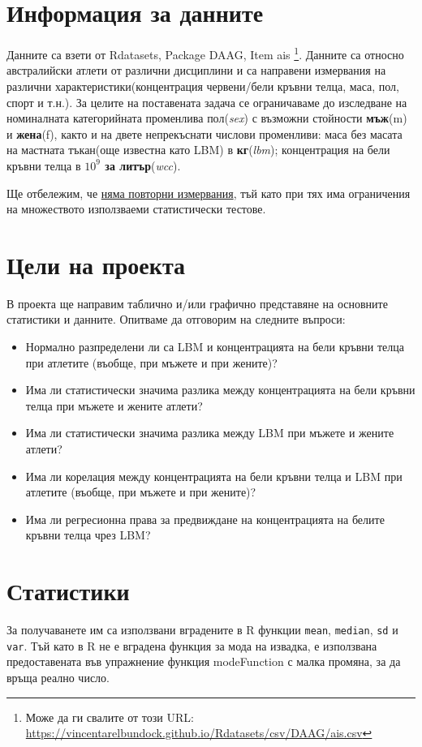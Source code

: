 \documentclass[12pt]{article} %
\newcommand{\code}{\texttt}
\begin{document}
\begin{large}

\tableofcontents{}


\section{Информация за данните}
Данните са взети от Rdatasets, Package DAAG, Item ais \footnote{Може да ги свалите от този URL: \url{https://vincentarelbundock.github.io/Rdatasets/csv/DAAG/ais.csv}}. Данните са относно австралийски атлети от различни дисциплини и са направени измервания на различни характеристики(концентрация червени/бели кръвни телца, маса, пол, спорт и т.н.). За целите на поставената задача се ограничаваме до изследване на номиналната категорийната променлива пол(\textit{sex}) с възможни стойности \textbf{мъж}(m) и \textbf{жена}(f), както и на двете непрекъснати числови променливи: маса без масата на мастната тъкан(още известна като LBM) в \textbf{кг}(\textit{lbm}); концентрация на бели кръвни телца в \textbf{$10^9$ за литър}(\textit{wcc}). \par
Ще отбележим, че \uline{няма повторни измервания}, тъй като при тях има ограничения на множеството използваеми статистически тестове.

\section{Цели на проекта}

В проекта ще направим таблично и/или графично представяне на основните статистики и данните. Опитваме да отговорим на следните въпроси:

\begin{itemize}
\item Нормално разпределени ли са LBM и концентрацията на бели кръвни телца при атлетите (въобще, при мъжете и при жените)?
\item Има ли статистически значима разлика между концентрацията на бели кръвни телца при мъжете и жените атлети?
\item Има ли статистически значима разлика между LBM при мъжете и жените атлети?
\item Има ли корелация между концентрацията на бели кръвни телца и LBM при атлетите (въобще, при мъжете и при жените)?
\item Има ли регресионна права за предвиждане на концентрацията на белите кръвни телца чрез LBM?
\end{itemize}

\section{Статистики}
За получаванете им са използвани вградените в R функции \code{mean}, \code{median}, \code{sd} и \code{var}. Тъй като в R не е вградена функция за мода на извадка, е използвана предоставената във упражнение функция modeFunction с малка промяна, за да връща реално число.


\end{large}
\end{document}
